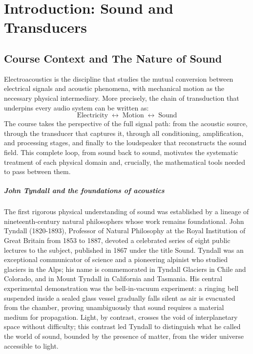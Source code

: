 
\graphicspath{{00_Images/01_chapter/}}

\chapter{Introduction: Sound and Transducers}
\label{ch:sound_transducers}

\section{Course Context and The Nature of Sound}

Electroacoustics is the discipline that studies the mutual conversion between electrical signals and acoustic phenomena, with mechanical motion as the necessary physical intermediary. More precisely, the chain of transduction that underpins every audio system can be written as:
\[
\text{Electricity} \;\longleftrightarrow\; \text{Motion} \;\longleftrightarrow\; \text{Sound}
\]
The course takes the perspective of the full signal path: from the acoustic source, through the transducer that captures it, through all conditioning, amplification, and processing stages, and finally to the loudspeaker that reconstructs the sound field. This complete loop, from sound back to sound, motivates the systematic treatment of each physical domain and, crucially, the mathematical tools needed to pass between them.

\paragraph{John Tyndall and the foundations of acoustics} The first rigorous physical understanding of sound was established by a lineage of nineteenth-century natural philosophers whose work remains foundational. John Tyndall (1820-1893), Professor of Natural Philosophy at the Royal Institution of Great Britain from 1853 to 1887, devoted a celebrated series of eight public lectures to the subject, published in 1867 under the title Sound. Tyndall was an exceptional communicator of science and a pioneering alpinist who studied glaciers in the Alps; his name is commemorated in Tyndall Glaciers in Chile and Colorado, and in Mount Tyndall in California and Tasmania. His central experimental demonstration was the bell-in-vacuum experiment: a ringing bell suspended inside a sealed glass vessel gradually falls silent as air is evacuated from the chamber, proving unambiguously that sound requires a material medium for propagation. Light, by contrast, crosses the void of interplanetary space without difficulty; this contrast led Tyndall to distinguish what he called the world of sound, bounded by the presence of matter, from the wider universe accessible to light.

